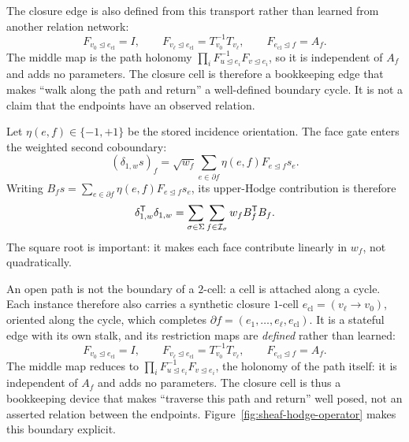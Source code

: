 The closure edge is also defined from this transport rather than learned from another relation
network:
\begin{equation}
  F_{v_0\unlhd e_{\mathrm{cl}}}=I,
  \qquad
  F_{v_\ell\unlhd e_{\mathrm{cl}}}=T_{v_0}^{-1}T_{v_\ell},
  \qquad
  F_{e_{\mathrm{cl}}\unlhd f}=A_f .
  \label{eq:closure-maps}
\end{equation}
The middle map is the path holonomy
\(\prod_i F_{u\unlhd e_i}^{-1}F_{v\unlhd e_i}\), so it is independent of \(A_f\) and adds no
parameters.  The closure cell is therefore a bookkeeping edge that makes ``walk along the path and
return'' a well-defined boundary cycle.  It is not a claim that the endpoints have an observed
relation.

Let \(\eta(e,f)\in\{-1,+1\}\) be the stored incidence orientation.  The face gate enters the
weighted second coboundary:
\begin{equation}
  (\delta_{1,w}s)_f
  =\sqrt{w_f}\sum_{e\in\partial f}
    \eta(e,f)F_{e\unlhd f}s_e .
  \label{eq:delta1}
\end{equation}
Writing
\(B_fs=\sum_{e\in\partial f}\eta(e,f)F_{e\unlhd f}s_e\), its upper-Hodge
contribution is therefore
\begin{equation}
  \delta_{1,w}^{\mathsf{T}}\delta_{1,w}
  =\sum_{\sigma\in\Sigma}\sum_{f\in\mathcal{I}_{\sigma}}
    w_f B_f^{\mathsf{T}}B_f .
  \label{eq:weighted-up}
\end{equation}
The square root is important: it makes each face contribute linearly in \(w_f\), not quadratically.

An open path is not the boundary of a \(2\)-cell: a cell is attached along a cycle.  Each instance
therefore also carries a synthetic closure \(1\)-cell \(e_{\mathrm{cl}}=(v_\ell\rightarrow v_0)\),
oriented along the cycle, which completes \(\partial f=(e_1,\ldots,e_\ell,e_{\mathrm{cl}})\).  It is a
stateful edge with its own stalk, and its restriction maps are \emph{defined} rather than learned:
\begin{equation}
  F_{v_0\unlhd e_{\mathrm{cl}}}=I,
  \qquad
  F_{v_\ell\unlhd e_{\mathrm{cl}}}=T_{v_0}^{-1}T_{v_\ell},
  \qquad
  F_{e_{\mathrm{cl}}\unlhd f}=A_f .
  \label{eq:closure-maps}
\end{equation}
The middle map reduces to \(\prod_i F_{u\unlhd e_i}^{-1}F_{v\unlhd e_i}\), the holonomy of the path
itself: it is independent of \(A_f\) and adds no parameters.  The closure cell is thus a bookkeeping
device that makes ``traverse this path and return'' well posed, not an asserted relation between the
endpoints.  Figure~\ref{fig:sheaf-hodge-operator} makes this boundary explicit.

